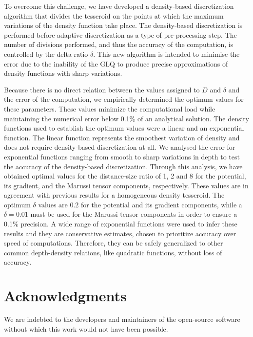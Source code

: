 \documentclass[extra, referee]{gji}
\begin{document}
To overcome this challenge, we have developed a density-based discretization algorithm
that divides the tesseroid on the points at which the maximum variations of the density
function take place.
The density-based discretization is performed before adaptive discretization as a type
of pre-processing step.
The number of divisions performed, and thus the accuracy of the computation, is
controlled by the delta ratio $\delta$.
This new algorithm is intended to minimise the error due to the inability of
the GLQ to produce precise approximations of density functions with sharp variations.

Because there is no direct relation between the values assigned to $D$ and $\delta$ and
the error of the computation, we empirically determined the optimum values for these
parameters.
These values minimize the computational load while maintaining the numerical error below
0.1\% of an analytical solution.
The density functions used to establish the optimum values were a linear and an
exponential function.
The linear function represents the smoothest variation of density and does not require
density-based discretization at all.
We analysed the error for exponential functions ranging from smooth to sharp variations
in depth to test the accuracy of the density-based discretization.
Through this analysis, we have obtained optimal values for the distance-size ratio of
1, 2 and 8 for the potential, its gradient, and the Marussi tensor components,
respectively.
These values are in agreement with previous results for a homogeneous density tesseroid.
The optimum $\delta$ values are 0.2 for the potential and its gradient components, while
a $\delta = 0.01$ must be used for the Marussi tensor components in order to ensure a
0.1\% precision.
A wide range of exponential functions were used to infer these results and they are
conservative estimates, chosen to prioritize accuracy over speed of computations.
Therefore, they can be safely generalized to other common depth-density relations, like
quadratic functions, without loss of accuracy.




\section{Acknowledgments}

We are indebted to the developers and maintainers of the open-source software without
which this work would not have been possible.
\end{document}
